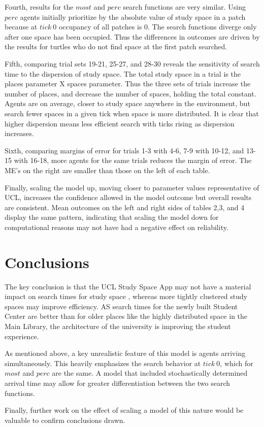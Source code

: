 \documentclass[11pt]{article} %
\begin{document}
Fourth, results for the $most$ and $perc$ search functions are very similar. Using $perc$ agents initially prioritize by the absolute value of study space in a patch because at $tick \: 0$ occupancy of all patches is 0.  The search functions diverge only after one space has been occupied. Thus the differences in outcomes are driven by the results for turtles who do not find space at the first patch searched. 

Fifth, comparing trial sets 19-21, 25-27, and 28-30 reveals the sensitivity of search time to the dispersion of study space. The total study space in a trial is the places parameter X spaces parameter. Thus the three sets of trials increase the number of places, and decrease the number of spaces, holding the total constant. Agents are on average, closer to study space anywhere in the environment, but search fewer spaces in a given tick when space is more distributed. It is clear that higher dispersion means less efficient search with ticks rising as dispersion increases. 

Sixth, comparing margins of error for trials 1-3 with 4-6, 7-9 with 10-12, and 13-15 with 16-18, more agents for the same trials reduces the margin of error. The ME's on the right are smaller than those on the left of each table. 

Finally, scaling the model up, moving closer to parameter values representative of UCL, increases the confidence allowed in the model outcome but overall results are consistent. Mean outcomes on the left and right sides of tables 2,3, and 4 display the same pattern, indicating that scaling the model down for computational reasons may not have had a negative effect on reliability. 

\section{Conclusions}

The key conclusion is that the UCL Study Space App may not have a material impact on search times for study space , whereas more tightly clustered study spaces may improve efficiency. AS search times for the newly built Student Center are better than for older places like the highly distributed space in the Main Library, the architecture of the university is improving the student experience. 

As mentioned above, a key unrealistic feature of this model is agents arriving simultaneously. This heavily emphasizes the search behavior at $tick \: 0$, which for $most$ and $perc$ are the same. A model that included stochastically determined arrival time may allow for greater differentiation between the two search functions. 

Finally, further work on the effect of scaling a model of this nature would be valuable to confirm conclusions drawn.  

\pagebreak

\printbibliography
\end{document}
